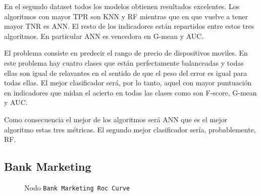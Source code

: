 \documentclass[..]{subfiles}
\begin{document}
\vspace{1.5em}
En el segundo dataset todos los modelos obtienen resultados excelentes. Los algoritmos con mayor TPR son KNN y RF mientras que en que vuelve a tener mayor TNR es ANN. El resto de los indicadores están repartidos entre estos tres algoritmos. En particular ANN es vencedora en G-mean y AUC.

El problema consiste en predecir el rango de precio de dispositivos moviles. En este problema hay cuatro clases que están perfectamente balanceadas y todas ellas son igual de relavantes en el sentido de que el peso del error es igual para todas ellas. El mejor clasificador será, por lo tanto, aquel con mayor puntuación en indicadores que midan el acierto en todas las clases como son F-score, G-mean y AUC. 

Como consecuencia el mejor de los algoritmos será ANN que es el mejor algoritmo estas tres métricas.
El segundo mejor clasificador sería, probablemente, RF.


\subsection{Bank Marketing}

\begin{figure}[h!]
	\centering
	
	\caption{Nodo \texttt{Bank Marketing Roc Curve}}
\end{figure}
\end{document}
